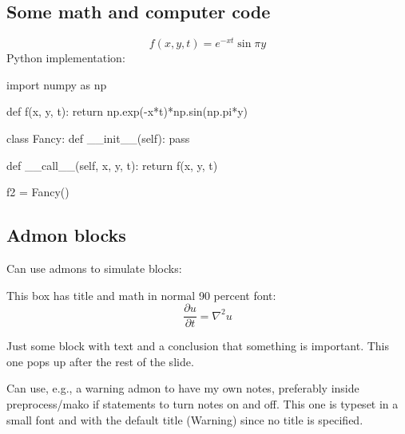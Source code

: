 \documentclass[%
oneside,                 %
final,                   %
10pt]{article}
\newenvironment{graybox1admon}[1][]{
\begin{graybox1mdframed}[frametitle=#1]
}
{
\end{graybox1mdframed}
}
\begin{document}
\noindent

\subsection{Some math and computer code}

\[ f(x,y,t) = e^{-xt}\sin\pi y \]
Python implementation:

\bpycod
import numpy as np

def f(x, y, t):
    return np.exp(-x*t)*np.sin(np.pi*y)

class Fancy:
    def __init__(self):
        pass

    def __call__(self, x, y, t):
        return f(x, y, t)

f2 = Fancy()
\epycod

\subsection{Admon blocks}

Can use admons to simulate blocks:


\begin{graybox1admon}[Key PDE:]
This box has title and math in normal 90 percent font:
\[ \frac{\partial u}{\partial t} = \nabla^2 u \]
\end{graybox1admon}


\begin{graybox1admon}[]
Just some block with text and a conclusion that something is important.
This one pops up after the rest of the slide.
\end{graybox1admon}



\begin{graybox1admon}[Warning.]
\vspace{0.5mm}\par\noindent
{\footnotesize Can use, e.g., a warning admon to have my own notes, preferably
inside preprocess/mako if statements to turn notes on and off.
This one is typeset in a small font and with the default
title (Warning) since no title is specified. \par}
\end{graybox1admon}



\printindex
\end{document}
